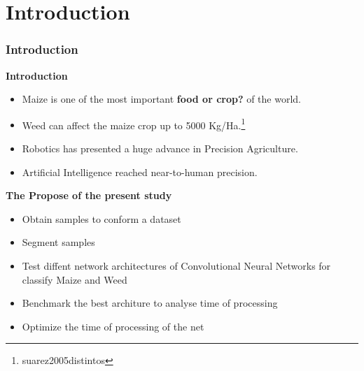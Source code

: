 \documentclass[10pt,a4paper]{beamer}
\begin{document}
\section{Introduction}
\begin{frame}
\frametitle{Introduction}
\textbf{Introduction}
\begin{itemize}
\item Maize is one of the most important \textbf{food or crop?} of the world.
\item Weed can affect the maize crop up to 5000 Kg/Ha.\footnote{suarez2005distintos} %
\item Robotics has presented a huge advance in Precision Agriculture.%
\item Artificial Intelligence reached near-to-human precision.%
\end{itemize}
\textbf{The Propose of the present study}
\begin{itemize}
\item Obtain samples to conform a dataset%
\item Segment samples%
\item Test diffent network architectures of Convolutional Neural Networks for classify Maize and Weed%
\item Benchmark the best architure to analyse time of processing %
\item Optimize the time of processing of the net%
\end{itemize}
\end{frame}
\end{document}
